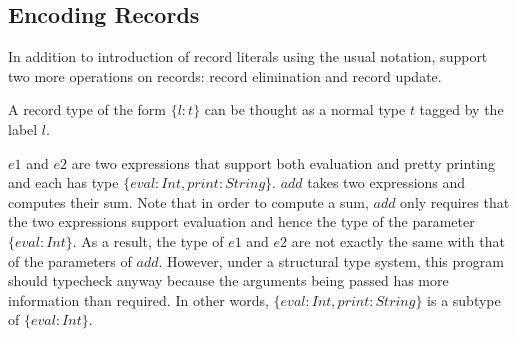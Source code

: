 






\subsection{Encoding Records}

In addition to introduction of record literals using the usual notation, \FI
support two more operations on records: record elimination and record update.

A record type of the form $ \{ l : t \} $ can be thought as a normal type $ t $
tagged by the label $ l $.



$ e1 $ and $ e2 $ are two expressions that support both evaluation and pretty
printing and each has type $ \{ eval : Int, print : String \} $. $ add $ takes
two expressions and computes their sum. Note that in order to compute a sum,
$ add $ only requires that the two expressions support evaluation and hence the
type of the parameter $ \{ eval : Int \} $. As a result, the type of $ e1 $ and
$ e2 $ are not exactly the same with that of the parameters of $ add $. However,
under a structural type system, this program should typecheck anyway because the
arguments being passed has more information than required. In other words,
$ \{ eval : Int, print : String \} $ is a subtype of $ \{ eval : Int \} $.

